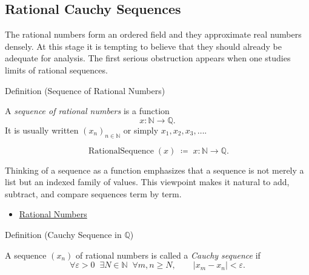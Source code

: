 
\subsection*{Rational Cauchy Sequences}
\label{sec:rational-cauchy}

\begin{exposition}
The rational numbers form an ordered field and they approximate real numbers
densely. At this stage it is tempting to believe that they should already be
adequate for analysis. The first serious obstruction appears when one studies
limits of rational sequences.
\end{exposition}

\begin{definitionbox}{Definition (Sequence of Rational Numbers)}
\begin{definition}
\label{def:rational-sequence}
A \emph{sequence of rational numbers} is a function
\[
x:\mathbb{N}\to\mathbb{Q}.
\]
It is usually written $(x_n)_{n\in\mathbb{N}}$ or simply $x_1,x_2,x_3,\dots$.
\end{definition}
\end{definitionbox}

\begin{remark*}
\[
\operatorname{RationalSequence}(x)
\;\coloneqq\;
x:\mathbb{N}\to\mathbb{Q}.
\]
\end{remark*}

\begin{remark*}[Interpretation]
Thinking of a sequence as a function emphasizes that a sequence is not merely
a list but an indexed family of values. This viewpoint makes it natural to add,
subtract, and compare sequences term by term.
\end{remark*}

\begin{dependencies}
\begin{itemize}
  \item \hyperref[def:rationals]{Rational Numbers}
\end{itemize}
\end{dependencies}

\begin{definitionbox}{Definition (Cauchy Sequence in $\mathbb{Q}$)}
\begin{definition}
\label{def:cauchy-rational}
A sequence $(x_n)$ of rational numbers is called a \emph{Cauchy sequence} if
\[
\forall \varepsilon>0\;\; \exists N\in\mathbb{N}\;\; \forall m,n\ge N,
\qquad
|x_m-x_n|<\varepsilon.
\]
\end{definition}
\end{definitionbox}

